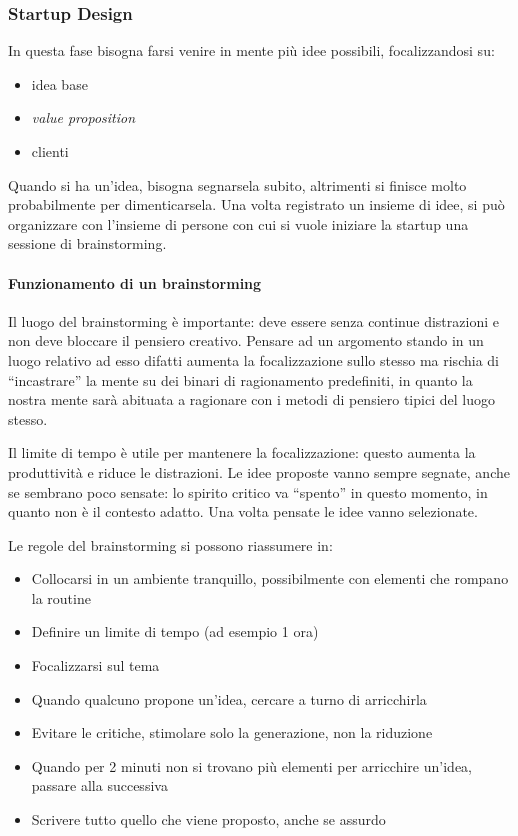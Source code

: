 \subsubsection{Startup Design}

In questa fase bisogna farsi venire in mente più idee possibili, focalizzandosi
su:
\begin{itemize}
 \item idea base
 \item \textit{value proposition}
 \item clienti
\end{itemize}

Quando si ha un'idea, bisogna segnarsela subito, altrimenti si finisce molto
probabilmente per dimenticarsela. Una volta registrato un insieme di idee, si
può organizzare con l'insieme di persone con cui si vuole iniziare la startup
una sessione di brainstorming.

\paragraph*{Funzionamento di un brainstorming} 
Il luogo del brainstorming è importante: deve essere senza continue distrazioni
e non deve bloccare il pensiero creativo. Pensare ad un argomento stando in un
luogo relativo ad esso difatti aumenta la focalizzazione sullo stesso ma
rischia di ``incastrare'' la mente su dei binari di ragionamento predefiniti,
in quanto la nostra mente sarà abituata a ragionare con i metodi di pensiero
tipici del luogo stesso.

Il limite di tempo è utile per mantenere la focalizzazione: questo aumenta la
produttività e riduce le distrazioni. Le idee proposte vanno sempre segnate,
anche se sembrano poco sensate: lo spirito critico va ``spento'' in questo
momento, in quanto non è il contesto adatto.
Una volta pensate le idee vanno selezionate.

Le regole del brainstorming si possono riassumere in:

\begin{itemize}
 \item Collocarsi in un ambiente tranquillo, possibilmente con elementi che
rompano la routine
 \item Definire un limite di tempo (ad esempio 1 ora)
 \item Focalizzarsi sul tema
 \item Quando qualcuno propone un'idea, cercare a turno di arricchirla
 \item Evitare le critiche, stimolare solo la generazione, non la riduzione
 \item Quando per 2 minuti non si trovano più elementi per arricchire un'idea,
passare alla successiva
 \item Scrivere tutto quello che viene proposto, anche se assurdo 
\end{itemize}

